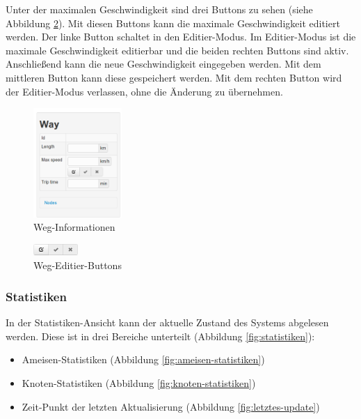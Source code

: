 \documentclass[
  a4paper,
  10pt
]{scrreprt}
\begin{document}
Unter der maximalen Geschwindigkeit sind drei Buttons zu sehen (siehe Abbildung \ref{fig:weg-editier-buttons}).
Mit diesen Buttons kann die maximale Geschwindigkeit editiert werden.
Der linke Button schaltet in den Editier-Modus.
Im Editier-Modus ist die maximale Geschwindigkeit editierbar und die beiden rechten Buttons sind aktiv.
Anschließend kann die neue Geschwindigkeit eingegeben werden.
Mit dem mittleren Button kann diese gespeichert werden.
Mit dem rechten Button wird der Editier-Modus verlassen, ohne die Änderung zu übernehmen.

\begin{figure}[htbp]
  \centering
  \includegraphics[width=0.3\textwidth]{Bilder/Weg-Informationen.png}
  \caption{Weg-Informationen}
  \label{fig:weg-informationen}
\end{figure}

\begin{figure}[htbp]
  \centering
  \includegraphics[width=0.15\textwidth]{Bilder/Weg-Editier-Buttons.png}
  \caption{Weg-Editier-Buttons}
  \label{fig:weg-editier-buttons}
\end{figure}

\subsubsection{Statistiken}
\label{sec:statistiken}

In der Statistiken-Ansicht kann der aktuelle Zustand des Systems abgelesen werden.
Diese ist in drei Bereiche unterteilt (Abbildung \ref{fig:statistiken}):

\begin{itemize}
  \item Ameisen-Statistiken (Abbildung \ref{fig:ameisen-statistiken})
  \item Knoten-Statistiken (Abbildung \ref{fig:knoten-statistiken})
  \item Zeit-Punkt der letzten Aktualisierung (Abbildung \ref{fig:letztes-update})
\end{itemize}
\end{document}

